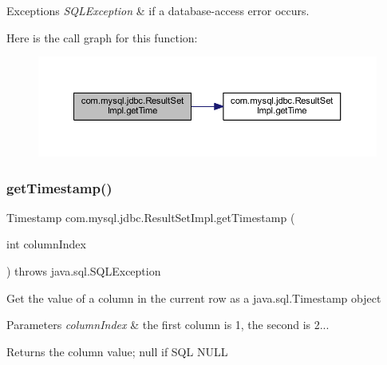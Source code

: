 \begin{DoxyExceptions}{Exceptions}
{\em S\+Q\+L\+Exception} & if a database-\/access error occurs. \\
\hline
\end{DoxyExceptions}
Here is the call graph for this function\+:
\nopagebreak
\begin{figure}[H]
\begin{center}
\leavevmode
\includegraphics[width=350pt]{classcom_1_1mysql_1_1jdbc_1_1_result_set_impl_a5014fd4ae2a0df1e39cb403441473e9b_cgraph}
\end{center}
\end{figure}
\mbox{\label{classcom_1_1mysql_1_1jdbc_1_1_result_set_impl_a2d88cacb474130b5646e9cd9fc043718}} 
\subsubsection{\texorpdfstring{get\+Timestamp()}{getTimestamp()}\hspace{0.1cm}{\footnotesize\ttfamily [1/4]}}
{\footnotesize\ttfamily Timestamp com.\+mysql.\+jdbc.\+Result\+Set\+Impl.\+get\+Timestamp (\begin{DoxyParamCaption}\item[{int}]{column\+Index }\end{DoxyParamCaption}) throws java.\+sql.\+S\+Q\+L\+Exception}

Get the value of a column in the current row as a java.\+sql.\+Timestamp object


\begin{DoxyParams}{Parameters}
{\em column\+Index} & the first column is 1, the second is 2...\\
\hline
\end{DoxyParams}
\begin{DoxyReturn}{Returns}
the column value; null if S\+QL N\+U\+LL
\end{DoxyReturn}

